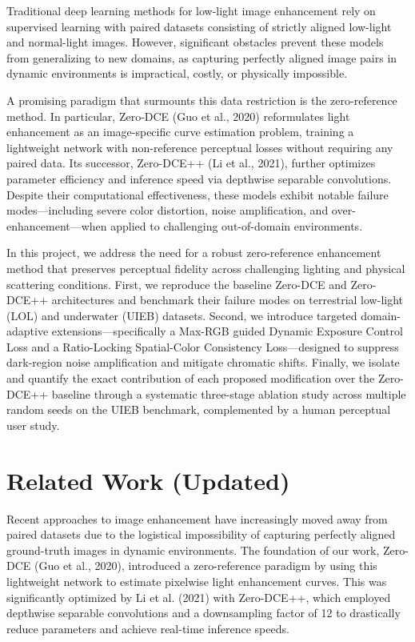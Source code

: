 \documentclass[11pt, letterpaper]{article}
\begin{document}
Traditional deep learning methods for low-light image enhancement rely on supervised learning with paired datasets consisting of strictly aligned low-light and normal-light images. However, significant obstacles prevent these models from generalizing to new domains, as capturing perfectly aligned image pairs in dynamic environments is impractical, costly, or physically impossible.

A promising paradigm that surmounts this data restriction is the zero-reference method. In particular, Zero-DCE (Guo et al., 2020) reformulates light enhancement as an image-specific curve estimation problem, training a lightweight network with non-reference perceptual losses without requiring any paired data. Its successor, Zero-DCE++ (Li et al., 2021), further optimizes parameter efficiency and inference speed via depthwise separable convolutions. Despite their computational effectiveness, these models exhibit notable failure modes—including severe color distortion, noise amplification, and over-enhancement—when applied to challenging out-of-domain environments.

In this project, we address the need for a robust zero-reference enhancement method that preserves perceptual fidelity across challenging lighting and physical scattering conditions. First, we reproduce the baseline Zero-DCE and Zero-DCE++ architectures and benchmark their failure modes on terrestrial low-light (LOL) and underwater (UIEB) datasets. Second, we introduce targeted domain-adaptive extensions—specifically a Max-RGB guided Dynamic Exposure Control Loss and a Ratio-Locking Spatial-Color Consistency Loss—designed to suppress dark-region noise amplification and mitigate chromatic shifts. Finally, we isolate and quantify the exact contribution of each proposed modification over the Zero-DCE++ baseline through a systematic three-stage ablation study across multiple random seeds on the UIEB benchmark, complemented by a human perceptual user study.

\section{Related Work (Updated)}

Recent approaches to image enhancement have increasingly moved away from paired datasets due to the logistical impossibility of capturing perfectly aligned ground-truth images in dynamic environments. The foundation of our work, Zero-DCE (Guo et al., 2020), introduced a zero-reference paradigm by using this lightweight network to estimate pixelwise light enhancement curves. This was significantly optimized by Li et al. (2021) with Zero-DCE++, which employed depthwise separable convolutions and a downsampling factor of 12 to drastically reduce parameters and achieve real-time inference speeds.
\end{document}
